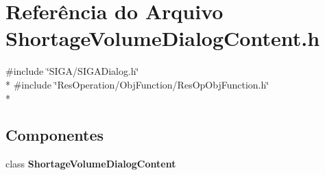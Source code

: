 \section{Referência do Arquivo Shortage\+Volume\+Dialog\+Content.\+h}
\label{_obj_function_2_shortage_volume_2_shortage_volume_dialog_content_8h}
{\ttfamily \#include \char`\"{}S\+I\+G\+A/\+S\+I\+G\+A\+Dialog.\+h\char`\"{}}\\*
{\ttfamily \#include \char`\"{}Res\+Operation/\+Obj\+Function/\+Res\+Op\+Obj\+Function.\+h\char`\"{}}\\*
\subsection*{Componentes}
\begin{DoxyCompactItemize}
\item 
class {\bf Shortage\+Volume\+Dialog\+Content}
\end{DoxyCompactItemize}
